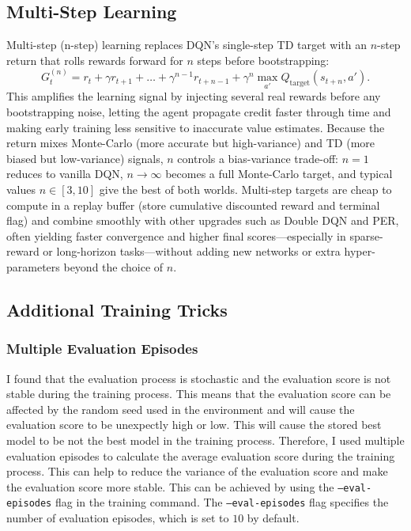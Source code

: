 \subsection{Multi-Step Learning}

Multi-step (n-step) learning replaces DQN's single-step TD target with an \(n\)-step return that rolls rewards forward for \(n\) steps before bootstrapping:
\[
    G^{(n)}_t = r_t + \gamma r_{t+1} + \dots + \gamma^{n-1} r_{t+n-1} + \gamma^{n} \max_{a'}Q_{\text{target}}(s_{t+n},a').
\]
This amplifies the learning signal by injecting several real rewards before any bootstrapping noise, letting the agent propagate credit faster through time and making early training less sensitive to inaccurate value estimates.
Because the return mixes Monte-Carlo (more accurate but high-variance) and TD (more biased but low-variance) signals, \(n\) controls a bias-variance trade-off: \(n=1\) reduces to vanilla DQN, \(n\to\infty\) becomes a full Monte-Carlo target, and typical values \(n\in[3,10]\) give the best of both worlds.
Multi-step targets are cheap to compute in a replay buffer (store cumulative discounted reward and terminal flag) and combine smoothly with other upgrades such as Double DQN and PER, often yielding faster convergence and higher final scores—especially in sparse-reward or long-horizon tasks—without adding new networks or extra hyper-parameters beyond the choice of \(n\).


\subsection{Additional Training Tricks}

\subsubsection{Multiple Evaluation Episodes}

I found that the evaluation process is stochastic and the evaluation score is not stable during the training process.
This means that the evaluation score can be affected by the random seed used in the environment and will cause the evaluation score to be unexpectly high or low.
This will cause the stored best model to be not the best model in the training process.
Therefore, I used multiple evaluation episodes to calculate the average evaluation score during the training process.
This can help to reduce the variance of the evaluation score and make the evaluation score more stable.
This can be achieved by using the \texttt{--eval-episodes} flag in the training command.
The \texttt{--eval-episodes} flag specifies the number of evaluation episodes, which is set to $10$ by default.

